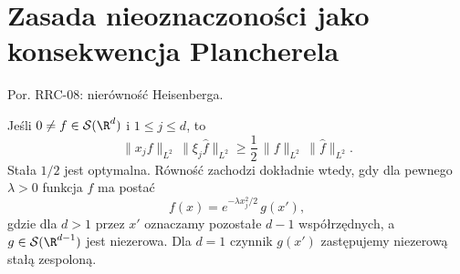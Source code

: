 \setcounter{section}{14}
\section{Zasada nieoznaczoności jako konsekwencja Plancherela}
\label{sec:dt-uncertainty}
\providecommand{\atlasref}[2]{#2}

Por. \atlasref{PDE-08::thm:pde8-uncertainty}{RRC-08: nierówność Heisenberga}.


\begin{twierdzenie}
\label{thm:dt-uncertainty}
Jeśli $0\ne f\in\mathcal S(\R^d)$ i $1\le j\le d$, to
\[
 \|x_jf\|_{L^2}\,\|\xi_j\widehat f\|_{L^2}
 \ge\frac12\,\|f\|_{L^2}\,\|\widehat f\|_{L^2}.
\]
Stała $1/2$ jest optymalna. Równość zachodzi
dokładnie wtedy, gdy dla pewnego $\lambda>0$
funkcja $f$ ma postać
\[
 f(x)=e^{-\lambda x_j^2/2}\,g(x'),
\]
gdzie dla $d>1$ przez $x'$ oznaczamy pozostałe
$d-1$ współrzędnych, a $g\in\mathcal S(\R^{d-1})$
jest niezerowa. Dla $d=1$ czynnik $g(x')$
zastępujemy niezerową stałą zespoloną.
\end{twierdzenie}
